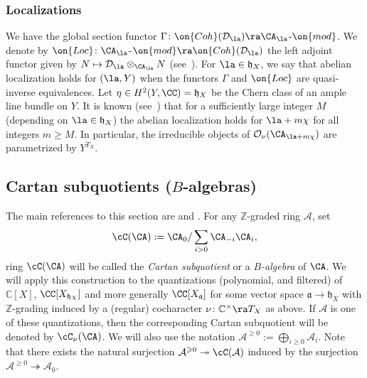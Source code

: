 \documentclass[12pt]{amsart}
\newcommand{\CO}{\mathcal{O}}
\begin{document}
\subsubsection{Localizations}\label{sec_Localizations} We have the global section functor $\Gamma\colon \on{Coh}(\mathcal{D}_\la) \ra \CA_\la$-$\on{mod}$.
	We denote by $\on{Loc}\colon \CA_\la$-$\on{mod} \ra \on{Coh}(\mathcal{D}_\la)$ the left adjoint functor given by $N \mapsto \mathcal{D}_\la \otimes_{\CA_\la} N$ (see~\cite[Section~4.2]{BPW}).
	For $\la \in \mathfrak{h}_{X}$, we say that abelian localization holds for $(\la,Y)$ when the functors
	$\Gamma$ and $\on{Loc}$ are quasi-inverse equivalences. Let $\eta\in H^2(Y,\CC)=\mathfrak{h}_{X}$ be the Chern class of an ample line bundle on $Y$. It is known (see~\cite[Corollary B.1]{BPW}) that for a sufficiently large integer $M$ (depending on $\la \in \mathfrak{h}_X$) the abelian localization holds for $\la + m\chi$ for all integers $m\ge M$.
	In particular, the irreducible objects of
	$\CO_\nu(\CA_{\la+m\chi})$ are parametrized by $Y^{T_X}$. 

\subsection{Cartan subquotients ($B$-algebras)}
The main references to this section are \cite[Sections 4,5]{LosevCatO} and \cite[Section 5.1]{BPWII}. For any $\mathbb{Z}$-graded ring $\mathcal{A}$, set 
\begin{equation*}
\cC(\CA):=\CA_{0}/\sum_{i>0}\CA_{-i}\CA_{i},
\end{equation*}
ring $\cC(\CA)$ will be called the {\em{Cartan subquotient}} or a {\em{$B$-algebra}} of $\CA$.
We will apply this construction to the quantizations (polynomial, and filtered) of $\mathbb{C}[X]$, $\CC[X_{\mathfrak{h}_X}]$ and more generally $\CC[X_{\mathfrak{a}}]$ for some vector space $\mathfrak{a} \rightarrow \mathfrak{h}_X$ with $\mathbb{Z}$-grading induced by a (regular) cocharacter $\nu\colon \mathbb{C}^\times \ra T_X$ as above. If $\mathcal{A}$ is one of these quantizations, then the corresponding Cartan subquotient will be denoted by $\cC_\nu(\CA)$. We will also use the notation $\mathcal{A}^{\geqslant 0}:=\bigoplus_{i \geqslant 0}\mathcal{A}_i$. Note that there exists the natural surjection $\mathcal{A}^{\geqslant 0} \twoheadrightarrow \cC(\mathcal{A})$ induced by the surjection $\mathcal{A}^{\geqslant 0} \twoheadrightarrow \mathcal{A}_0$.
\end{document}
